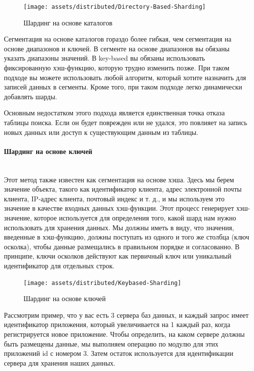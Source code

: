 \begin{figure}[H]
    \centering
    \texttt{[image: assets/distributed/Directory-Based-Sharding]}
    \caption{Шардинг на основе каталогов}
    \label{fig:Directory-Based-Sharding}
\end{figure}

Сегментация на основе каталогов гораздо более гибкая, чем сегментация на основе диапазонов и ключей. В сегменте на
основе диапазонов вы обязаны указать диапазоны значений. В key-based вы обязаны использовать фиксированную хэш-функцию,
которую трудно изменить позже. При таком подходе вы можете использовать любой алгоритм, который хотите назначить для
записей данных в сегменты. Кроме того, при таком подходе легко динамически добавлять шарды.

Основным недостатком этого подхода является единственная точка отказа таблицы поиска. Если он будет поврежден или не
удался, это повлияет на запись новых данных или доступ к существующим данным из таблицы. \autocite{DatabaseSharding}

\paragraph{Шардинг на основе ключей} ~\\
Этот метод также известен как сегментация на основе хэша. Здесь мы берем значение объекта, такого как идентификатор
клиента, адрес электронной почты клиента, IP-адрес клиента, почтовый индекс и т. д., и мы используем это значение в
качестве входных данных хэш-функции. Этот процесс генерирует хэш-значение, которое используется для определения того,
какой шард нам нужно использовать для хранения данных. Мы должны иметь в виду, что значения, введенные в хэш-функцию,
должны поступать из одного и того же столбца (ключ осколка), чтобы данные размещались в правильном порядке и
согласованно. В принципе, ключи осколков действуют как первичный ключ или уникальный идентификатор для отдельных строк.

\begin{figure}[H]
    \centering
    \texttt{[image: assets/distributed/Keybased-Sharding]}
    \caption{Шардинг на основе ключей}
    \label{fig:Keybased-Sharding}
\end{figure}

Рассмотрим пример, что у вас есть 3 сервера баз данных, и каждый запрос имеет идентификатор приложения, который
увеличивается на 1 каждый раз, когда регистрируется новое приложение. Чтобы определить, на каком сервере должны быть
размещены данные, мы выполняем операцию по модулю для этих приложений id с номером 3. Затем остаток используется для
идентификации сервера для хранения наших данных.

